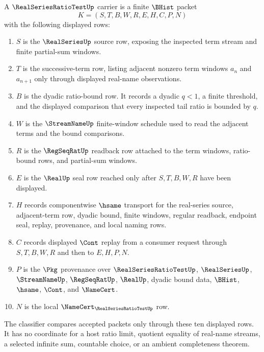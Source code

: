 \begin{definition}
\label{def:real-series-ratio-test-carrier}
A $\RealSeriesRatioTestUp$ carrier is a finite $\BHist$ packet
$$
K=(S,T,B,W,R,E,H,C,P,N)
$$
with the following displayed rows:
\begin{enumerate}
\item $S$ is the $\RealSeriesUp$ source row, exposing the inspected term stream and finite partial-sum windows.
\item $T$ is the successive-term row, listing adjacent nonzero term windows $a_{n}$ and $a_{n+1}$ only through displayed real-name observations.
\item $B$ is the dyadic ratio-bound row. It records a dyadic $q<1$, a finite threshold, and the displayed comparison that every inspected tail ratio is bounded by $q$.
\item $W$ is the $\StreamNameUp$ finite-window schedule used to read the adjacent terms and the bound comparisons.
\item $R$ is the $\RegSeqRatUp$ readback row attached to the term windows, ratio-bound rows, and partial-sum windows.
\item $E$ is the $\RealUp$ seal row reached only after $S,T,B,W,R$ have been displayed.
\item $H$ records componentwise $\hsame$ transport for the real-series source, adjacent-term row, dyadic bound, finite windows, regular readback, endpoint seal, replay, provenance, and local naming rows.
\item $C$ records displayed $\Cont$ replay from a consumer request through $S,T,B,W,R$ and then to $E,H,P,N$.
\item $P$ is the $\Pkg$ provenance over $\RealSeriesRatioTestUp$, $\RealSeriesUp$, $\StreamNameUp$, $\RegSeqRatUp$, $\RealUp$, dyadic bound data, $\BHist$, $\hsame$, $\Cont$, and $\NameCert$.
\item $N$ is the local $\NameCert_{\RealSeriesRatioTestUp}$ row.
\end{enumerate}
The classifier compares accepted packets only through these ten displayed rows. It has no coordinate for a host ratio limit, quotient equality of real-name streams, a selected infinite sum, countable choice, or an ambient completeness theorem.
\end{definition}

